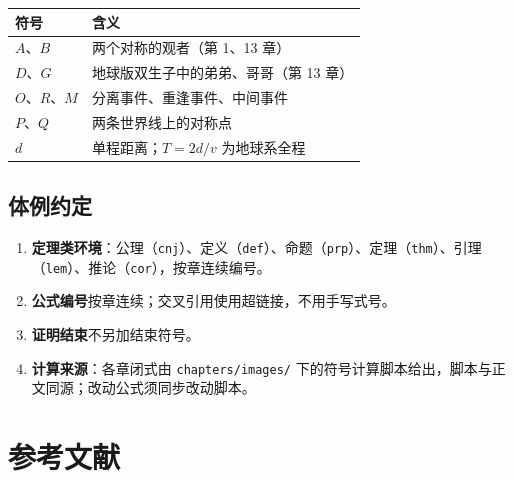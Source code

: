 \documentclass[
  chinese,
  a4paper,
  UTF8,
  12pt,
  oneside,
  openany]{ctexbook}
\newcounter{none} %
\providecommand{\tightlist}{%
  \setlength{\itemsep}{0pt}\setlength{\parskip}{0pt}}
\theoremstyle{plain}
\theoremstyle{plain}
\theoremstyle{plain}
\theoremstyle{definition}
\theoremstyle{plain}
\theoremstyle{plain}
\theoremstyle{remark}
\begin{document}

{\def\LTcaptype{none} %
\begin{longtable}[]{@{}ll@{}}
\toprule\noalign{}
符号 & 含义 \\
\midrule\noalign{}
\endhead
\bottomrule\noalign{}
\endlastfoot
\(A\)、\(B\) & 两个对称的观者（第 1、13 章） \\
\(D\)、\(G\) & 地球版双生子中的弟弟、哥哥（第 13 章） \\
\(O\)、\(R\)、\(M\) & 分离事件、重逢事件、中间事件 \\
\(P\)、\(Q\) & 两条世界线上的对称点 \\
\(d\) & 单程距离；\(T=2d/v\) 为地球系全程 \\
\end{longtable}
}

\section*{体例约定}\label{sec-notation-style}


\begin{enumerate}
\def\labelenumi{\arabic{enumi}.}
\tightlist
\item
  \textbf{定理类环境}：公理（\texttt{cnj}）、定义（\texttt{def}）、命题（\texttt{prp}）、定理（\texttt{thm}）、引理（\texttt{lem}）、推论（\texttt{cor}），按章连续编号。
\item
  \textbf{公式编号}按章连续；交叉引用使用超链接，不用手写式号。
\item
  \textbf{证明结束}不另加结束符号。
\item
  \textbf{计算来源}：各章闭式由 \texttt{chapters/images/}
  下的符号计算脚本给出，脚本与正文同源；改动公式须同步改动脚本。
\end{enumerate}


\chapter*{参考文献}\label{ux53c2ux8003ux6587ux732e}

\end{document}
